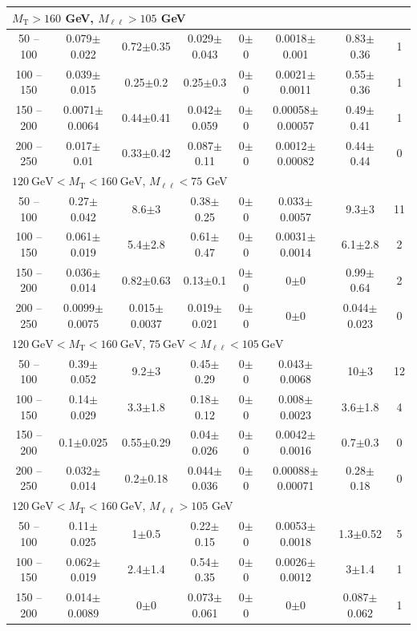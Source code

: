 \begin{table}
\begin{center}
\begin{tabular}{| c | c c c c c c c | }
\multicolumn{8}{l}{$M_{\text{T}} > 160$ GeV, $M_{\ell\ell} > 105$ GeV}\\\hline\hline
50 -- 100&0.079$\pm$0.022&0.72$\pm$0.35&0.029$\pm$0.043&0$\pm$0&0.0018$\pm$0.001&0.83$\pm$0.36&1\\
100 -- 150&0.039$\pm$0.015&0.25$\pm$0.2&0.25$\pm$0.3&0$\pm$0&0.0021$\pm$0.0011&0.55$\pm$0.36&1\\
150 -- 200&0.0071$\pm$0.0064&0.44$\pm$0.41&0.042$\pm$0.059&0$\pm$0&0.00058$\pm$0.00057&0.49$\pm$0.41&1\\
200 -- 250&0.017$\pm$0.01&0.33$\pm$0.42&0.087$\pm$0.11&0$\pm$0&0.0012$\pm$0.00082&0.44$\pm$0.44&0\\
\hline\hline
\multicolumn{8}{l}{$120~\mathrm{GeV} < M_{\text{T}} < 160~\mathrm{GeV}$, $M_{\ell\ell} < 75$ GeV}\\\hline\hline
50 -- 100&0.27$\pm$0.042&8.6$\pm$3&0.38$\pm$0.25&0$\pm$0&0.033$\pm$0.0057&9.3$\pm$3&11\\
100 -- 150&0.061$\pm$0.019&5.4$\pm$2.8&0.61$\pm$0.47&0$\pm$0&0.0031$\pm$0.0014&6.1$\pm$2.8&2\\
150 -- 200&0.036$\pm$0.014&0.82$\pm$0.63&0.13$\pm$0.1&0$\pm$0&0$\pm$0&0.99$\pm$0.64&2\\
200 -- 250&0.0099$\pm$0.0075&0.015$\pm$0.0037&0.019$\pm$0.021&0$\pm$0&0$\pm$0&0.044$\pm$0.023&0\\
\hline\hline
\multicolumn{8}{l}{$120~\mathrm{GeV} < M_{\text{T}} < 160~\mathrm{GeV}$, $75~\mathrm{GeV} < M_{\ell\ell} < 105~\mathrm{GeV}$}\\\hline\hline
50 -- 100&0.39$\pm$0.052&9.2$\pm$3&0.45$\pm$0.29&0$\pm$0&0.043$\pm$0.0068&10$\pm$3&12\\
100 -- 150&0.14$\pm$0.029&3.3$\pm$1.8&0.18$\pm$0.12&0$\pm$0&0.008$\pm$0.0023&3.6$\pm$1.8&4\\
150 -- 200&0.1$\pm$0.025&0.55$\pm$0.29&0.04$\pm$0.026&0$\pm$0&0.0042$\pm$0.0016&0.7$\pm$0.3&0\\
200 -- 250&0.032$\pm$0.014&0.2$\pm$0.18&0.044$\pm$0.036&0$\pm$0&0.00088$\pm$0.00071&0.28$\pm$0.18&0\\
\hline\hline
\multicolumn{8}{l}{$120~\mathrm{GeV} < M_{\text{T}} < 160~\mathrm{GeV}$, $M_{\ell\ell} > 105$ GeV}\\\hline\hline
50 -- 100&0.11$\pm$0.025&1$\pm$0.5&0.22$\pm$0.15&0$\pm$0&0.0053$\pm$0.0018&1.3$\pm$0.52&5\\
100 -- 150&0.062$\pm$0.019&2.4$\pm$1.4&0.54$\pm$0.35&0$\pm$0&0.0026$\pm$0.0012&3$\pm$1.4&1\\
150 -- 200&0.014$\pm$0.0089&0$\pm$0&0.073$\pm$0.061&0$\pm$0&0$\pm$0&0.087$\pm$0.062&1\\

\end{tabular}
\end{center}
\end{table}
